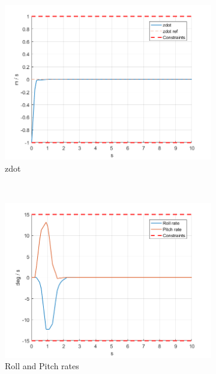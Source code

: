 \documentclass[11pt]{article}
\begin{document}
\begin{enumerate}
\begin{figure}[ht]
        \begin{subfigure}[c]{0.3\linewidth}
            \centering
            \includegraphics[width=\linewidth]{Plots_03_FirstMPCController/04}
            \caption{zdot}
        \end{subfigure}
        ~
        \begin{subfigure}[c]{0.3\linewidth}
            \centering
            \includegraphics[width=\linewidth]{Plots_03_FirstMPCController/05}
            \caption{Roll and Pitch rates}
        \end{subfigure}
        ~
        \begin{subfigure}[c]{0.3\linewidth}
            \centering

\end{subfigure}
\end{figure}
\end{enumerate}
\end{document}

